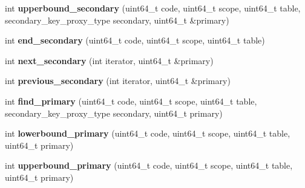 \begin{DoxyCompactItemize}
\item 
\mbox{\label{classaacio_1_1chain_1_1apply__context_1_1generic__index_a4900d70e44f22f05b6284d7b47705775}} 
int {\bfseries upperbound\+\_\+secondary} (uint64\+\_\+t code, uint64\+\_\+t scope, uint64\+\_\+t table, secondary\+\_\+key\+\_\+proxy\+\_\+type secondary, uint64\+\_\+t \&primary)
\item 
\mbox{\label{classaacio_1_1chain_1_1apply__context_1_1generic__index_a49155104d518d50b17a7952a6d8a155f}} 
int {\bfseries end\+\_\+secondary} (uint64\+\_\+t code, uint64\+\_\+t scope, uint64\+\_\+t table)
\item 
\mbox{\label{classaacio_1_1chain_1_1apply__context_1_1generic__index_a26d710a9b877104bfdd6378b8adaf8fb}} 
int {\bfseries next\+\_\+secondary} (int iterator, uint64\+\_\+t \&primary)
\item 
\mbox{\label{classaacio_1_1chain_1_1apply__context_1_1generic__index_ae98455a06489e0dac02247750d2940bc}} 
int {\bfseries previous\+\_\+secondary} (int iterator, uint64\+\_\+t \&primary)
\item 
\mbox{\label{classaacio_1_1chain_1_1apply__context_1_1generic__index_ac5cdac613c7d1599803a1d682a70ac3c}} 
int {\bfseries find\+\_\+primary} (uint64\+\_\+t code, uint64\+\_\+t scope, uint64\+\_\+t table, secondary\+\_\+key\+\_\+proxy\+\_\+type secondary, uint64\+\_\+t primary)
\item 
\mbox{\label{classaacio_1_1chain_1_1apply__context_1_1generic__index_aa68de3682275135ded38a4e5883fa717}} 
int {\bfseries lowerbound\+\_\+primary} (uint64\+\_\+t code, uint64\+\_\+t scope, uint64\+\_\+t table, uint64\+\_\+t primary)
\item 
\mbox{\label{classaacio_1_1chain_1_1apply__context_1_1generic__index_a7152012ed0e8d578af062e80c56712b7}} 
int {\bfseries upperbound\+\_\+primary} (uint64\+\_\+t code, uint64\+\_\+t scope, uint64\+\_\+t table, uint64\+\_\+t primary)

\end{DoxyCompactItemize}
